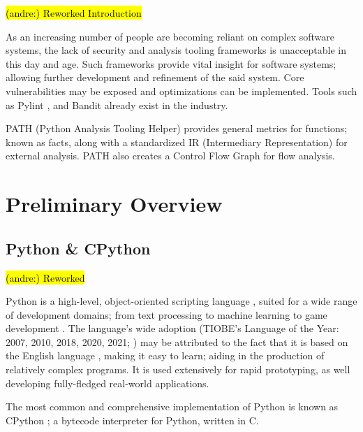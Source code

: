 \documentclass[12pt, a4paper]{report}
\DeclareRobustCommand{\andre}[1]{ {\begingroup\sethlcolor{BurntOrange}\hl{(andre:) #1}\endgroup} }
\theoremstyle{definition}
\theoremstyle{definition}%
\theoremstyle{definition}%
\theoremstyle{definition}%
\theoremstyle{definition}%
\theoremstyle{definition}%
\begin{document}
\andre{Reworked Introduction}

\par As an increasing number of people are becoming reliant on complex software systems, the lack of security and analysis
tooling frameworks is unacceptable in this day and age. Such frameworks provide vital insight for software systems;
allowing further development and refinement of the said system. Core vulnerabilities may be exposed and optimizations can be implemented.
Tools such as Pylint \cite{pylint2021}, and Bandit \cite{bandit2022} already exist in the industry.

\par PATH (Python Analysis Tooling Helper) provides general metrics for functions; known as facts, along with a
 standardized IR (Intermediary Representation) for external analysis. PATH also creates a Control Flow Graph for flow analysis.

    \section{Preliminary Overview}
        \subsection{Python \& CPython}
        \andre{Reworked}
        \par Python is a high-level, object-oriented scripting language \cite{lutz2001programming}, 
        suited for a wide range of development domains; from text processing \cite{bonta2019comprehensive} to 
        machine learning \cite{tensorflowTour} to game development \cite{sweigart2012making}. 
        The language's wide adoption (TIOBE's Language of the Year: 2007, 2010, 2018, 2020, 2021; \cite{tiobe2022index}) 
        may be attributed to the fact that it is based on the English language \cite{saabith2019python}, 
        making it easy to learn; aiding in the production of relatively complex programs. It is used extensively for rapid prototyping,
        as well developing fully-fledged real-world applications.

        \par The most common and comprehensive implementation of Python is known as CPython \cite{van2021python}; a bytecode interpreter for Python, written in C.
\end{document}
